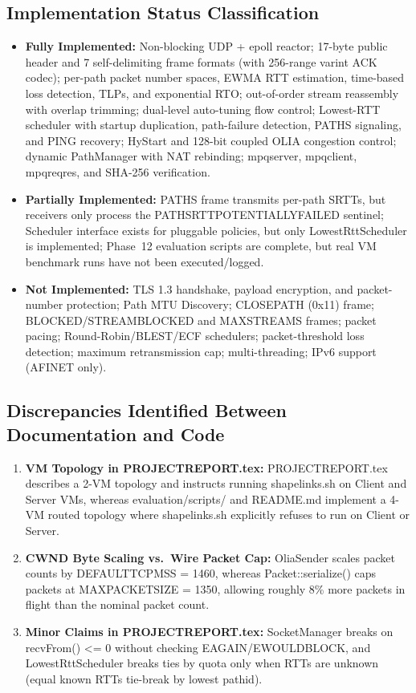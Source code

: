 \documentclass[10pt,a4paper]{article}
\newcommand{\codeul}{\textunderscore\hspace{0pt}}
\DeclareRobustCommand{\code}[1]{{\ttfamily\let\_\codeul #1}}
\begin{document}
\subsection{Implementation Status Classification}
\begin{itemize}
    \item \textbf{Fully Implemented:} Non-blocking UDP + \code{epoll} reactor; 17-byte public header and 7 self-delimiting frame formats (with 256-range varint ACK codec); per-path packet number spaces, EWMA RTT estimation, time-based loss detection, TLPs, and exponential RTO; out-of-order stream reassembly with overlap trimming; dual-level auto-tuning flow control; Lowest-RTT scheduler with startup duplication, path-failure detection, \code{PATHS} signaling, and \code{PING} recovery; HyStart and 128-bit coupled OLIA congestion control; dynamic \code{PathManager} with NAT rebinding; \code{mpq\_server}, \code{mpq\_client}, \code{mpq\_reqres}, and SHA-256 verification.
    \item \textbf{Partially Implemented:} \code{PATHS} frame transmits per-path SRTTs, but receivers only process the \code{PATHS\_RTT\_POTENTIALLY\_FAILED} sentinel; \code{Scheduler} interface exists for pluggable policies, but only \code{LowestRttScheduler} is implemented; Phase~12 evaluation scripts are complete, but real VM benchmark runs have not been executed/logged.
    \item \textbf{Not Implemented:} TLS 1.3 handshake, payload encryption, and packet-number protection; Path MTU Discovery; \code{CLOSE\_PATH} (\code{0x11}) frame; \code{BLOCKED}/\code{STREAM\_BLOCKED} and \code{MAX\_STREAMS} frames; packet pacing; Round-Robin/BLEST/ECF schedulers; packet-threshold loss detection; maximum retransmission cap; multi-threading; IPv6 support (\code{AF\_INET} only).
\end{itemize}

\subsection{Discrepancies Identified Between Documentation and Code}
\begin{enumerate}
    \item \textbf{VM Topology in \code{PROJECT\_REPORT.tex}:} \code{PROJECT\_REPORT.tex} describes a 2-VM topology and instructs running \code{shape\_links.sh} on Client and Server VMs, whereas \code{evaluation/scripts/} and \code{README.md} implement a 4-VM routed topology where \code{shape\_links.sh} explicitly refuses to run on Client or Server.
    \item \textbf{CWND Byte Scaling vs.\ Wire Packet Cap:} \code{OliaSender} scales packet counts by \code{DEFAULT\_TCP\_MSS = 1460}, whereas \code{Packet::serialize()} caps packets at \code{MAX\_PACKET\_SIZE = 1350}, allowing roughly 8\% more packets in flight than the nominal packet count.
    \item \textbf{Minor Claims in \code{PROJECT\_REPORT.tex}:} \code{SocketManager} breaks on \code{recvFrom() <= 0} without checking \code{EAGAIN}/\code{EWOULDBLOCK}, and \code{LowestRttScheduler} breaks ties by \code{quota} only when RTTs are unknown (equal known RTTs tie-break by lowest \code{path\_id}).
\end{enumerate}
\end{document}
